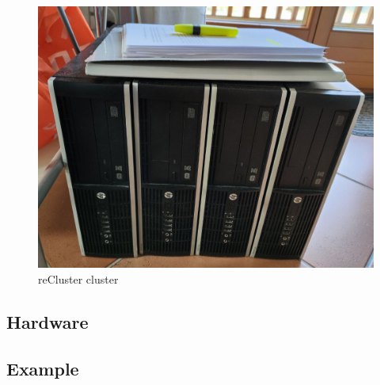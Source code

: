 \begin{figure}
  \centering
  \includegraphics[width=.5\textwidth]{images/recluster/cluster.png}
  \caption{reCluster cluster}
\end{figure}

\subsection{Hardware}
\label{subsec:architecture_cluster_hardware}


\subsection{Example}
\label{subsec:architecture_cluster_example}

